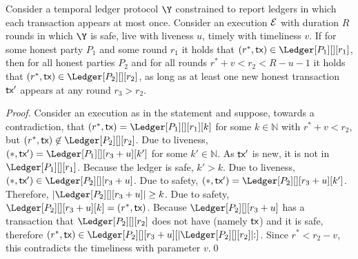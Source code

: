 \begin{lemma}
  Consider a temporal ledger protocol $\Y$
  constrained to report ledgers in which each transaction appears at most once.
  Consider an execution $\mathcal{E}$ with duration $R$ rounds in which $\Y$ is
  safe, live with liveness $u$, timely with timeliness $v$.
  If for some honest party $P_1$ and some round $r_1$ it holds that
  $(r^*, \tx) \in \Ledger[P_1][][r_1]$, then
  for all honest parties $P_2$ and for all rounds $r^* + v < r_2 < R - u - 1$
  it holds that
  $(r^*, \tx) \in \Ledger[P_2][][r_2]$,
  as long as at least one new honest transaction $\textsf{tx}'$ appears at
  any round $r_3 > r_2$.
\end{lemma}
\begin{proof}
  Consider an execution as in the statement and suppose, towards a contradiction,
  that $(r^*, \tx) = \Ledger[P_1][][r_1][k]$ for some $k \in \mathbb{N}$
  with $r^* + v < r_2$, but
  $(r^*, \tx) \not\in \Ledger[P_2][][r_2]$.
  Due to liveness,
  $(*, \tx') = \Ledger[P_1][][r_3 + u][k']$ for some $k' \in \mathbb{N}$.
  As $\textsf{tx}'$ is new, it is not in $\Ledger[P_1][][r_1]$.
  Because the ledger is safe, $k' > k$.
  Due to liveness, $(*, \tx') \in \Ledger[P_2][][r_3 + u]$.
  Due to safety, $(*, \tx') = \Ledger[P_2][][r_3 + u][k']$.
  Therefore, $|\Ledger[P_2][][r_3 + u]| \geq k$.
  Due to safety, $\Ledger[P_2][][r_3 + u][k] = (r^*, \tx)$.
  Because $\Ledger[P_2][][r_3 + u]$ has a transaction
  that $\Ledger[P_2][][r_2]$ does not have (namely $\textsf{tx}$)
  and it is safe, therefore
  $(r^*, \tx) \in \Ledger[P_2][][r_3 + u][|\Ledger[P_2][][r_2]|{:}]$.
  Since $r^* < r_2 - v$, this contradicts the timeliness with parameter $v$.\qed
\end{proof}

